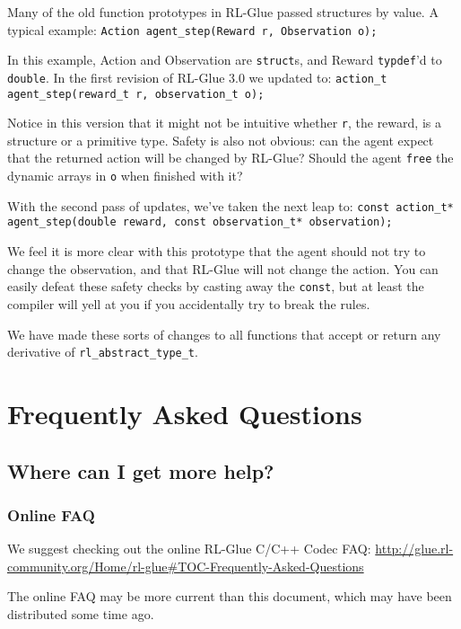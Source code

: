 \documentclass[11pt]{article}
\begin{document}
Many of the old function prototypes in RL-Glue passed structures by value.  A typical example:\newline
\texttt{Action agent\_step(Reward r, Observation o);}

In this example, Action and Observation are \texttt{struct}s, and Reward \texttt{typdef}'d to \texttt{double}.  In the 
first revision of RL-Glue 3.0 we updated to:\newline
\texttt{action\_t agent\_step(reward\_t r, observation\_t o);}

Notice in this version that it might not be intuitive whether \texttt{r}, the reward, is a structure or a primitive type.  
Safety is also not obvious: can the agent expect that the returned action will be changed by RL-Glue?  Should the agent 
\texttt{free} the dynamic arrays in \texttt{o} when finished with it? 

With the second pass of updates, we've taken the next leap to:\newline
\texttt{const action\_t* agent\_step(double reward, const observation\_t* observation);}

We feel it is more clear with this prototype that the agent should not try to change the observation, and that 
RL-Glue will not change the action.  You can easily defeat these safety checks by casting away the \texttt{const}, 
but at least the compiler will yell at you if you accidentally try to break the rules.

We have made these sorts of changes to all functions that accept or return any derivative of 
\texttt{rl\_abstract\_type\_t}.





\section{Frequently Asked Questions}
\subsection{Where can I get more help?}
\subsubsection{Online FAQ}
We suggest checking out the online RL-Glue C/C++ Codec FAQ:\newline
\url{http://glue.rl-community.org/Home/rl-glue#TOC-Frequently-Asked-Questions}

The online FAQ may be more current than this document, which may have been distributed some time ago.
\end{document}
